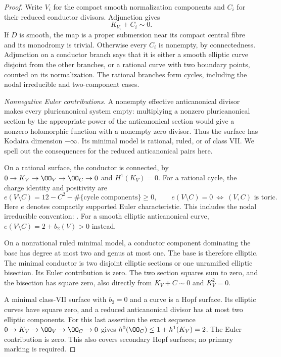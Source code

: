 \begin{proof}
Write $V_i$ for the compact smooth normalization
components and $C_i$ for their reduced conductor divisors.
Adjunction gives
\[
 K_{V_i}+C_i\sim0.                                  \tag{B.4.28.2}
\]
If $D$ is smooth, the map is a proper submersion near
its compact central fibre and its monodromy is trivial.
Otherwise every $C_i$ is nonempty, by connectedness.
Adjunction on a conductor branch says that it is either
a smooth elliptic curve disjoint from the other branches,
or a rational curve with two boundary points, counted
on its normalization. The rational branches form cycles,
including the nodal irreducible and two-component cases.

\emph{Nonnegative Euler contributions.}
A nonempty effective anticanonical divisor makes every
pluricanonical system empty: multiplying a nonzero
pluricanonical section by the appropriate power of the
anticanonical section would give a nonzero holomorphic
function with a nonempty zero divisor. Thus the surface
has Kodaira dimension $-\infty$. Its minimal model is
rational, ruled, or of class VII. We spell out the
consequences for the reduced anticanonical pairs here.

On a rational surface, the conductor is connected, by
$0\to K_V\to\OO_V\to\OO_C\to0$ and $H^1(K_V)=0$.
For a rational cycle, the charge identity and positivity
are
\[
 e(V\setminus C)=12-C^2-\#\{\text{cycle components}\}
 \ge0,\qquad
 e(V\setminus C)=0\ \Longleftrightarrow\ (V,C)
 \text{ is toric}.                                  \tag{B.4.28.3}
\]
Here $e$ denotes compactly supported Euler characteristic.
This includes the nodal irreducible convention:
\citet[Definition 1.1 and Lemmas 1.2, 2.2, 2.7]{Friedman2016AB}.
For a smooth elliptic anticanonical curve,
$e(V\setminus C)=2+b_2(V)>0$ instead.

On a nonrational ruled minimal model, a conductor
component dominating the base has degree at most two
and genus at most one. The base is therefore elliptic.
The minimal conductor is two disjoint elliptic sections
or one unramified elliptic bisection. Its Euler
contribution is zero. The two section squares sum to
zero, and the bisection has square zero, also directly
from $K_V+C\sim0$ and $K_V^2=0$.

A minimal class-VII surface with $b_2=0$ and a curve is
a Hopf surface. Its elliptic curves have square zero,
and a reduced anticanonical divisor has at most two
elliptic components. For this last assertion the exact
sequence $0\to K_V\to\OO_V\to\OO_C\to0$ gives
$h^0(\OO_C)\le1+h^1(K_V)=2$.
The Euler contribution is zero. This also covers
secondary Hopf surfaces; no primary marking is required.


\end{proof}
